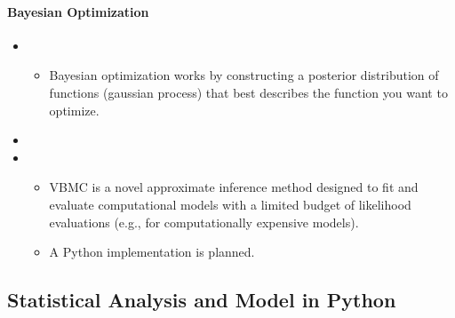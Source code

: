 \documentclass[letterpaper,10pt,english]{sphinxmanual}
\begin{document}
\paragraph{Bayesian Optimization}
\label{\detokenize{resource/programing/python_optimization:bayesian-optimization}}\begin{itemize}
\item {} 
\begin{itemize}
\item {} 
Bayesian optimization works by constructing a posterior
distribution of functions (gaussian process) that best describes
the function you want to optimize.

\end{itemize}

\item {} 

\item {} 
\begin{itemize}
\item {} 
VBMC is a novel approximate inference method designed to fit and
evaluate computational models with a limited budget of likelihood
evaluations (e.g., for computationally expensive models).

\item {} 
A Python implementation is planned.

\end{itemize}

\end{itemize}


\subsection{Statistical Analysis and Model in Python}
\label{\detokenize{resource/programing/python_statistics:statistical-analysis-and-model-in-python}}\label{\detokenize{resource/programing/python_statistics::doc}}
\end{document}
